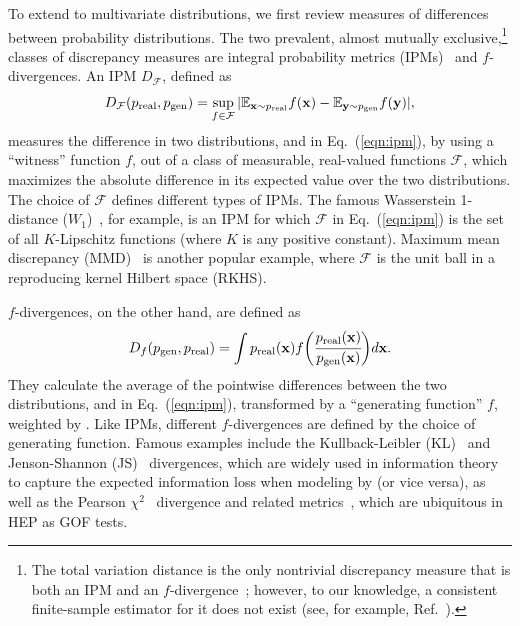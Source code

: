 To extend to multivariate distributions, we first review measures of differences between probability distributions.
The two prevalent, almost mutually exclusive,\footnote{The total variation distance is the only nontrivial discrepancy measure that is both an IPM and an $f$-divergence~\cite[Appendix A]{sriperumbudur_empirical}; however, to our knowledge, a consistent finite-sample estimator for it does not exist (see, for example, Ref.~\cite[Section 5]{sriperumbudur_empirical}).} classes of discrepancy measures are integral probability metrics (IPMs)~\cite{muller_ipms} and $f$-divergences.
An IPM $D_\mathcal{F}$, defined as
\
\begin{equation}\label{eqn:ipm}
    D_\mathcal{F}(p_\mathrm{real}, p_\mathrm{gen}) = \sup _{f \in \mathcal F} |\mathbb E_{\mathbf{x} \sim p_\mathrm{real}} f(\mathbf{x}) - \mathbb E_{\mathbf{y} \sim p_\mathrm{gen}} f(\mathbf{y})|,
\end{equation}
measures the difference in two distributions,  and  in Eq.~(\ref{eqn:ipm}), by using a ``witness'' function $f$, out of a class of measurable, real-valued functions $\mathcal{F}$, which maximizes the absolute difference in its expected value over the two distributions.
The choice of $\mathcal{F}$ defines different types of IPMs.
The famous Wasserstein 1-distance ($W_1$)~\cite{wasserstein_original,villani_ot}, for example, is an IPM for which $\mathcal F$ in Eq.~(\ref{eqn:ipm}) is the set of all $K$-Lipschitz functions (where $K$ is any positive constant).
Maximum mean discrepancy (MMD)~\cite{gretton_mmd} is another popular example, where $\mathcal F$ is the unit ball in a reproducing kernel Hilbert space (RKHS).

$f$-divergences, on the other hand, are defined as
\begin{equation}\label{eqn:fdiv}
    D_f(p_\mathrm{gen}, p_\mathrm{real}) = \int p_\mathrm{real} (\mathbf{x}) f \bigg( \cfrac{p_\mathrm{real} (\mathbf{x})}{p_\mathrm{gen} (\mathbf{x})} \bigg ) d\mathbf{x}.
\end{equation}
They calculate the average of the pointwise differences between the two distributions,  and  in Eq.~(\ref{eqn:ipm}), transformed by a ``generating function'' $f$, weighted by .
Like IPMs, different $f$-divergences are defined by the choice of generating function.
Famous examples include the Kullback-Leibler (KL)~\cite{kl} and Jenson-Shannon (JS)~\cite{js_1,js_2} divergences, which are widely used in information theory to capture the expected information loss when modeling  by  (or vice versa), as well as the Pearson $\chi^2$~\cite{pearson} divergence and related metrics~\cite{Baker:1983tu,generalization_gof,parametric}, which are ubiquitous in HEP as GOF tests.

